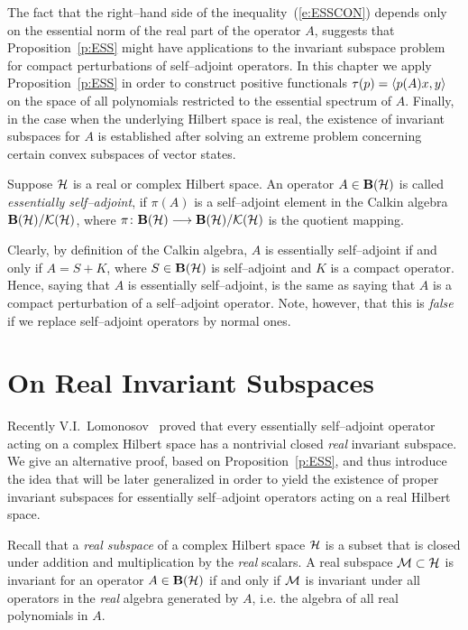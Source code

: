 \smallskip

The fact that the right--hand side of the inequality~(\ref{e:ESSCON}) depends
only on the essential norm of the real part of the operator $A$, suggests
that Proposition~\ref{p:ESS} might have applications to the invariant
subspace problem for compact perturbations of self--adjoint operators. In
this chapter we apply Proposition~\ref{p:ESS} in order to construct positive
functionals $\tau(p)=\left<p(A)x,y\right>$ on the space of all polynomials
restricted to the essential spectrum of $A$. Finally, in the case when the
underlying Hilbert space is real, the existence of invariant subspaces for
$A$ is established after solving an extreme problem concerning certain convex
subspaces of vector states.

\begin{defn}
Suppose ${\cal H}$ is a real or complex Hilbert space. An operator $A\in\mathbf B(\cal H)$ is
called \emph{essentially self--adjoint}, if $\pi(A)$ is a self--adjoint
element in the Calkin algebra $\mathbf B(\cal H)/\cal K(\cal H)$, where $\pi\colon\mathbf B(\cal H)\longrightarrow\mathbf B(\cal H)/\cal K(\cal H)$ is
the quotient mapping.
\end{defn}

\begin{rem}
Clearly, by definition of the Calkin algebra, $A$ is essentially
self--adjoint if and only if $A=S+K$, where $S\in\mathbf B(\cal H)$ is self--adjoint and
$K$ is a compact operator. Hence, saying that $A$ is essentially
self--adjoint, is the same as saying that $A$ is a compact perturbation of a
self--adjoint operator. Note, however, that this is {\em{}false} if we
replace self--adjoint operators by normal ones.
\end{rem}

\goodbreak
\section{On Real Invariant Subspaces}

Recently V.I.~Lomonosov~\cite{Lom92} proved that every essentially
self--adjoint operator acting on a complex Hilbert space has a nontrivial
closed \emph{real} invariant subspace. We give an alternative proof, based on
Proposition~\ref{p:ESS}, and thus introduce the idea that will be later
generalized in order to yield the existence of proper invariant subspaces for
essentially self--adjoint operators acting on a real Hilbert space.

Recall that a \emph{real subspace} of a complex Hilbert space ${\cal H}$ is a
subset that is closed under addition and multiplication by the \emph{real}
scalars. A real subspace $\cal{M}\subset{\cal H}$ is invariant for an operator
$A\in\mathbf B(\cal H)$ if and only if $\cal{M}$ is invariant under all operators in the
\emph{real} algebra generated by $A$, i.e. the algebra of all real
polynomials in $A$.

